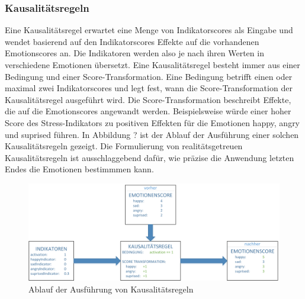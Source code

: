 \subsubsection{Kausalitätsregeln}
Eine Kausalitätsregel erwartet eine Menge von Indikatorscores als Eingabe und wendet basierend auf den Indikatorscores Effekte auf die vorhandenen Emotionscores an. Die Indikatoren werden also je nach ihren Werten in verschiedene Emotionen übersetzt. \newline Eine Kausalitätsregel besteht immer aus einer Bedingung und einer Score-Transformation. Eine Bedingung betrifft einen oder maximal zwei Indikatorscores und legt fest, wann die Score-Transformation der Kausalitätsregel ausgeführt wird. Die Score-Transformation beschreibt Effekte, die auf die Emotionscores angewandt werden. Beispielsweise würde einer hoher Score des Stress-Indikators zu positiven Effekten für die Emotionen happy, angry und suprised führen. In Abbildung ? ist der Ablauf der Ausführung einer solchen Kausalitätsregeln gezeigt. Die Formulierung von realitätsgetreuen Kausalitätsregeln ist ausschlaggebend dafür, wie präzise die Anwendung letzten Endes die Emotionen bestimmmen kann. \newline
\begin{figure}[h]
	\centering
	\includegraphics[width=16cm]{Bilder/causalityrules.png}
	\caption[Ablauf der Ausführung von Kausalitätsregeln]{Ablauf der Ausführung von Kausalitätsregeln}
\end{figure}%
